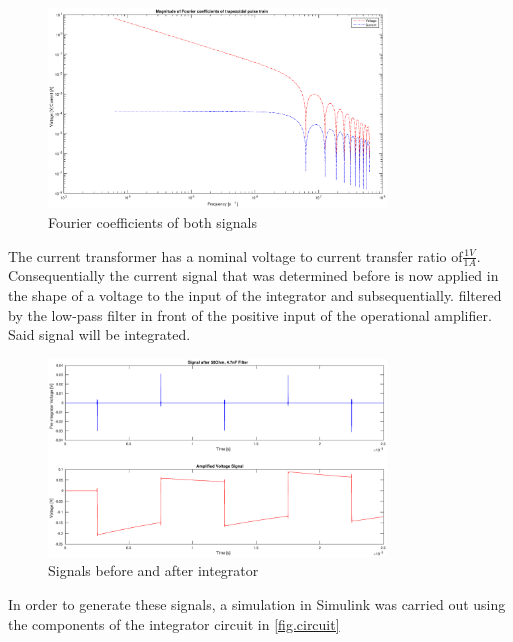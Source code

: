 \begin{figure}[h!tb]
\centerline{\includegraphics[width=0.8\textwidth]{figures/Method/signal_simulation/fourierla.eps}}
\caption{Fourier coefficients of both signals}
\label{fig.fourierla}
\end{figure}

The current transformer has a nominal voltage to current transfer ratio of$\frac{1V}{1A}$. 
Consequentially the current signal that was determined before is now applied in the shape of a voltage to the input of the integrator and subsequentially.
filtered by the low-pass filter in front of the positive input of the operational amplifier. Said signal will be integrated.


\begin{figure}[h!tb]
\centerline{\includegraphics[width=0.8\textwidth]{figures/Method/signal_simulation/integrated.eps}}
\caption{Signals before and after integrator}
\label{fig.integrator}
\end{figure}

In order to generate these signals, a simulation in Simulink was carried out using the components of the integrator circuit in \ref{fig.circuit}

